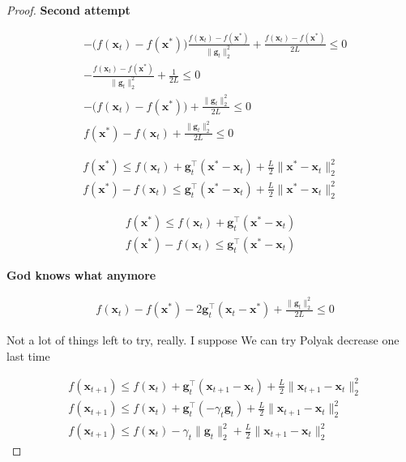 \documentclass{article}
\begin{document}
\begin{proof}
	\textbf{Second attempt}

	\begin{align}
		&- \big( f(\mathbf{x}_t) - f(\mathbf{x}^*) \big) \frac{f(\mathbf{x}_t) - f(\mathbf{x}^*)}{\|\mathbf{g}_t\|^2_2} + \frac{f(\mathbf{x}_t) - f(\mathbf{x}^*)}{2L}\le 0\\
		&-   \frac{f(\mathbf{x}_t) - f(\mathbf{x}^*)}{\|\mathbf{g}_t\|^2_2} + \frac{1}{2L}\le 0\\
		&-  \big(f(\mathbf{x}_t) - f(\mathbf{x}^*)\big) + \frac{\|\mathbf{g}_t\|^2_2}{2L}\le 0\\
		& f(\mathbf{x}^*) - f(\mathbf{x}_t) + \frac{\|\mathbf{g}_t\|^2_2}{2L}\le 0
	\end{align}
	
	\begin{align}
		f(\mathbf{x}^*) \le f(\mathbf{x}_t) + \mathbf{g}_t^\top (\mathbf{x}^*-\mathbf{x}_t) + \frac{L}{2}\|\mathbf{x}^*-\mathbf{x}_t\|^2_2\\
		f(\mathbf{x}^*) -  f(\mathbf{x}_t) \le  \mathbf{g}_t^\top (\mathbf{x}^*-\mathbf{x}_t) + \frac{L}{2}\|\mathbf{x}^*-\mathbf{x}_t\|^2_2
	\end{align}

	\begin{align}
		f(\mathbf{x}^*) \le f(\mathbf{x}_t) + \mathbf{g}_t^\top(\mathbf{x}^*-\mathbf{x}_t)\\
		f(\mathbf{x}^*) - f(\mathbf{x}_t) \le  \mathbf{g}_t^\top(\mathbf{x}^*-\mathbf{x}_t)
	\end{align}
	
	\textbf{God knows what anymore}

	\begin{align}
		&f(\mathbf{x}_t) - f(\mathbf{x}^*) - 2\mathbf{g}^\top_t(\mathbf{x}_t - \mathbf{x}^*) + \frac{\|\mathbf{g}_t\|^2_2}{2L}  \le 0
	\end{align}
	
	Not a lot of things left to try, really. I suppose We can try Polyak decrease one last time
	
	\begin{align}
		&f(\mathbf{x}_{t+1}) \le f(\mathbf{x}_t) + \mathbf{g}_t^\top(\mathbf{x}_{t+1} - \mathbf{x}_t) + \frac{L}{2}\| \mathbf{x}_{t+1} - \mathbf{x}_t \|^2_2\\
		&f(\mathbf{x}_{t+1}) \le f(\mathbf{x}_t) + \mathbf{g}_t^\top(-\gamma_t\mathbf{g}_t) + \frac{L}{2}\| \mathbf{x}_{t+1} - \mathbf{x}_t \|^2_2\\
		&f(\mathbf{x}_{t+1}) \le f(\mathbf{x}_t) -\gamma_t\|\mathbf{g}_t\|^2_2 + \frac{L}{2}\| \mathbf{x}_{t+1} - \mathbf{x}_t \|^2_2
	\end{align}
	

\end{proof}
\end{document}
